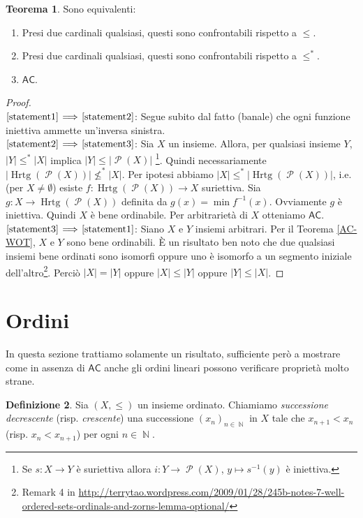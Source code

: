 \documentclass[12pt,a4paper]{report}
\theoremstyle{definition}
\newtheorem{teo}{Teorema}[section]  %
\newtheorem{defn}[teo]{Definizione}  %
\theoremstyle{num.custom-title}
\DeclareMathOperator{\PP}{\mathcal{P}}
\DeclareMathOperator{\Hrtg}{\text{Hrtg}}
\DeclareMathOperator{\N}{\mathbb{N}}
\newcommand{\AC}{\ensuremath{\mathsf{AC}}\xspace}
\newcommand{\Implies}[2]{$\text{\ref{statement#1}}\!\implies\!\text{\ref{statement#2}}$}%
\newcommand{\punto}[1]{\item \label{statement#1}}
\newenvironment{equivalence}
    {\begin{enumerate}[label=(\arabic*),ref=(\arabic*)]
    }
    { 
	\end{enumerate}
    }
\begin{document}
\begin{teo} Sono equivalenti:
\begin{equivalence}
\punto{1} Presi due cardinali qualsiasi, questi sono confrontabili rispetto a $\leq$.
\punto{2} Presi due cardinali qualsiasi, questi sono confrontabili rispetto a $\leq^*$.
\punto{3} \AC.
\end{equivalence}
\begin{proof}\ \\
\Implies{1}{2}: Segue subito dal fatto (banale) che ogni funzione iniettiva ammette un'inversa sinistra.\\
\Implies{2}{3}: Sia $X$ un insieme. Allora, per qualsiasi insieme $Y$, $|Y| \leq^* |X|$ implica $|Y| \leq |\PP(X)|$ \footnote{Se $s: X \to Y$ è suriettiva allora $i: Y \to \PP(X)$, $y \mapsto s^{-1}(y)$ è iniettiva.}. Quindi necessariamente $|\Hrtg(\PP(X))| \not\leq^* |X|$. Per ipotesi abbiamo $|X| \leq^* |\Hrtg(\PP(X))|$, i.e. (per $X \neq \emptyset$) esiste $f: \Hrtg(\PP(X)) \to X$ suriettiva. Sia $g: X \to \Hrtg(\PP(X))$ definita da $g(x)=\min f^{-1}(x)$. Ovviamente $g$ è iniettiva. Quindi $X$ è bene ordinabile. Per arbitrarietà di $X$ otteniamo \AC.\\
\Implies{3}{1}: Siano $X$ e $Y$ insiemi arbitrari.  Per il Teorema \ref{AC-WOT}, $X$ e $Y$ sono bene ordinabili. È un risultato ben noto che due qualsiasi insiemi bene ordinati sono isomorfi oppure uno è isomorfo a un segmento iniziale dell'altro\footnote{Remark 4 in \url{http://terrytao.wordpress.com/2009/01/28/245b-notes-7-well-ordered-sets-ordinals-and-zorns-lemma-optional/}}. Perciò $|X|=|Y|$ oppure $|X| \leq |Y|$ oppure $|Y| \leq |X|$.
\end{proof}
\end{teo}


\section{Ordini}

In questa sezione trattiamo solamente un risultato, sufficiente però a mostrare come in assenza di \AC anche gli ordini lineari possono verificare proprietà molto strane.

\begin{defn}
Sia $(X, \leq)$ un insieme ordinato. Chiamiamo \emph{successione decrescente} (risp. \emph{crescente}) una successione $(x_n)_{n \in \N}$ in $X$ tale che $x_{n+1} < x_n$ (risp. $x_n < x_{n+1}$) per ogni $n \in \N$.
\end{defn}
\end{document}
